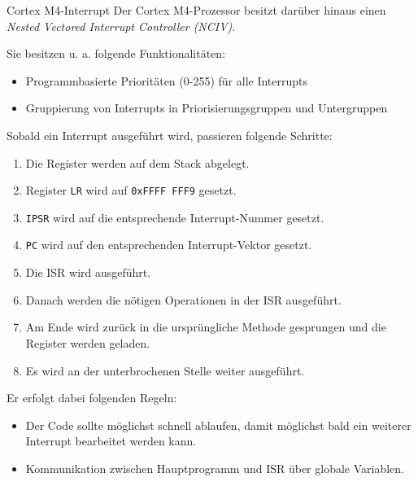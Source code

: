 \begin{defi}{Cortex M4-Interrupt}
    Der Cortex M4-Prozessor besitzt darüber hinaus einen \emph{Nested Vectored Interrupt Controller (NCIV)}.

    Sie besitzen u. a. folgende Funktionalitäten:
    \begin{itemize}
        \item Programmbasierte Prioritäten (0-255) für alle Interrupts
        \item Gruppierung von Interrupts in Priorisierungsgruppen und Untergruppen
    \end{itemize}

    Sobald ein Interrupt ausgeführt wird, passieren folgende Schritte:
    \begin{enumerate}
        \item Die Register werden auf dem Stack abgelegt.
        \item Register \texttt{LR} wird auf \texttt{0xFFFF FFF9} gesetzt.
        \item \texttt{IPSR} wird auf die entsprechende Interrupt-Nummer gesetzt.
        \item \texttt{PC} wird auf den entsprechenden Interrupt-Vektor gesetzt.
        \item Die ISR wird ausgeführt.
        \item Danach werden die nötigen Operationen in der ISR ausgeführt.
        \item Am Ende wird zurück in die ursprüngliche Methode gesprungen und die Register werden geladen.
        \item Es wird an der unterbrochenen Stelle weiter ausgeführt.
    \end{enumerate}

    Er erfolgt dabei folgenden Regeln:
    \begin{itemize}
        \item Der Code sollte möglichst schnell ablaufen, damit möglichst bald ein weiterer Interrupt bearbeitet werden kann.
        \item Kommunikation zwischen Hauptprogramm und ISR über globale Variablen.
    \end{itemize}
\end{defi}

